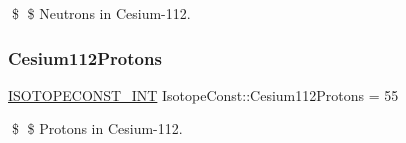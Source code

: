 \$ \$ Neutrons in Cesium-\/112. \mbox{\label{group___isotope_const-_cesium-_cs112_ga7e70565da74e39e1eafb561b64145789}} 
\subsubsection{\texorpdfstring{Cesium112\+Protons}{Cesium112Protons}}
{\footnotesize\ttfamily \mbox{\hyperlink{group___isotope_const-_macros_ga5f18360b3e99483a35c32d789e62621c}{I\+S\+O\+T\+O\+P\+E\+C\+O\+N\+S\+T\+\_\+\+I\+NT}} Isotope\+Const\+::\+Cesium112\+Protons = 55}

\$ \$ Protons in Cesium-\/112. 